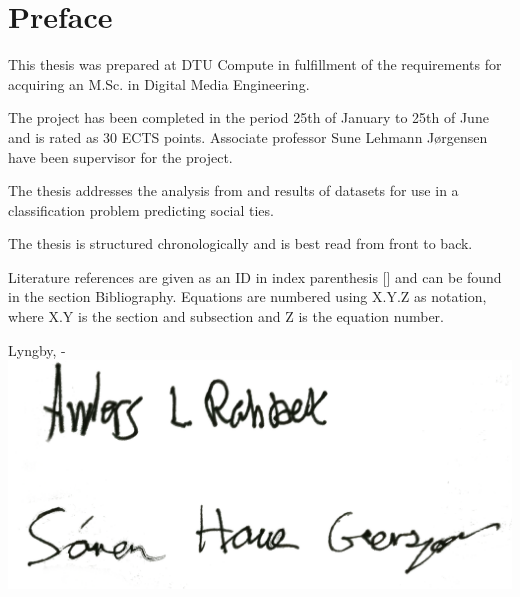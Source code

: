 \chapter{Preface}
This thesis was prepared at DTU Compute in fulfillment of the requirements for acquiring an M.Sc. in Digital Media Engineering.

The project has been completed in the period 25th of January to 25th of June and is rated as 30 ECTS points. Associate professor Sune Lehmann Jørgensen have been supervisor for the project.

The thesis addresses the analysis from and results of datasets for use in a classification problem predicting social ties.

The thesis is structured chronologically and is best read from front to back.

Literature references are given as an ID in index parenthesis [] and can be found in the section Bibliography.
Equations are numbered using X.Y.Z as notation, where X.Y is the section and subsection and Z is the equation number.

\vspace{10mm}
\begin{center}
    \hspace{20mm} Lyngby, \thesishandin-\thesisyear
    \vspace{2mm}
    \newline
    \includegraphics[scale=0.05]{figures/signature}
\end{center}
\begin{flushright}
    \thesisauthor
\end{flushright}
